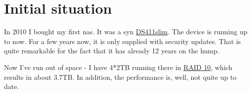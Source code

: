 

\section{Initial situation}

In 2010 I bought my first \gls{nas}. It was a \gls{syn}
\href{https://global.download.synology.com/download/Document/Hardware/DataSheet/DiskStation/11-year/DS411slim/ger/Synology_DS411slim_Data_Sheet_ger.pdf}{DS411slim}.
The device is running up to now. For a few years now, it is only supplied with
security updates. That is quite remarkable for the fact that it has already 12
years on the hump.
\bigbreak

Now I've run out of space - I have 4*2TB running there in \href{https://en.wikipedia.org/wiki/RAID}{RAID 10},
which results in about 3.7TB. In addition, the performance is, well, not quite up
to date.
